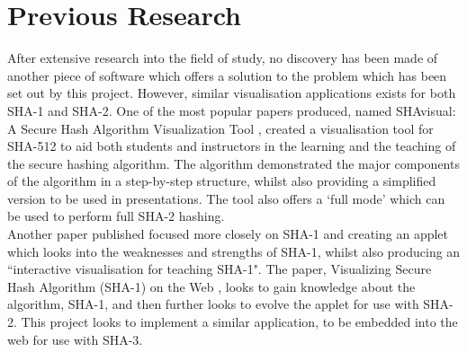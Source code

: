 \section{Previous Research}
After extensive research into the field of study, no discovery has been made of another piece of software which offers a solution to the problem which has been set out by this project. However, similar visualisation applications exists for both SHA-1 and SHA-2. One of the most popular papers produced, named SHAvisual: A Secure Hash Algorithm Visualization Tool \cite{SHAvisual}, created a visualisation tool for SHA-512 to aid both students and instructors in the learning and the teaching of the secure hashing algorithm. The algorithm demonstrated the major components of the algorithm in a step-by-step structure, whilst also providing a simplified version to be used in presentations. The tool also offers a `full mode' which can be used to perform full SHA-2 hashing. 
\vspace{5 mm}\\
Another paper published focused more closely on SHA-1 and creating an applet which looks into the weaknesses and strengths of SHA-1, whilst also producing an ``interactive visualisation for teaching SHA-1". The paper, Visualizing Secure Hash Algorithm (SHA-1) on the Web \cite{VisSHA1}, looks to gain knowledge about the algorithm, SHA-1, and then further looks to evolve the applet for use with SHA-2. This project looks to implement a similar application, to be embedded into the web for use with SHA-3.
